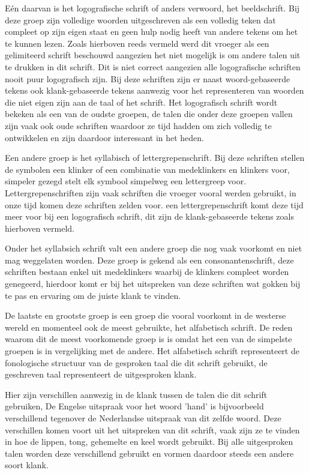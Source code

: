Eén daarvan is het logografische schrift of anders verwoord, het beeldschrift.
Bij deze groep zijn volledige woorden uitgeschreven als een volledig teken dat compleet op zijn eigen staat en geen hulp nodig heeft van andere tekens om het te kunnen lezen.
Zoals hierboven reeds vermeld werd dit vroeger als een gelimiteerd schrift beschouwd aangezien het niet mogelijk is om andere talen uit te drukken in dit schrift.
Dit is niet correct aangezien alle logografische schriften nooit puur logografisch zijn. Bij deze schriften zijn er naast woord-gebaseerde tekens ook klank-gebaseerde tekens aanwezig voor het representeren van woorden die niet eigen zijn aan de taal of het schrift.
Het logografisch schrift wordt bekeken als een van de oudste groepen, de talen die onder deze groepen vallen zijn vaak ook oude schriften waardoor ze tijd hadden om zich volledig te ontwikkelen en zijn daardoor interessant in het heden.

Een andere groep is het syllabisch of lettergrepenschrift.
Bij deze schriften stellen de symbolen een klinker of een combinatie van medeklinkers en klinkers voor, simpeler gezegd stelt elk symbool simpelweg een lettergreep voor.
Lettergrepenschriften zijn vaak schriften die vroeger vooral werden gebruikt, in onze tijd komen deze schriften zelden voor.
een lettergrepenschrift komt deze tijd meer voor bij een logografisch schrift, dit zijn de klank-gebaseerde tekens zoals hierboven vermeld.

Onder het syllabsich schrift valt een andere groep die nog vaak voorkomt en niet mag weggelaten worden.
Deze groep is gekend als een consonantenschrift, deze schriften bestaan enkel uit medeklinkers waarbij de klinkers compleet worden genegeerd, hierdoor komt er bij het uitspreken van deze schriften wat gokken bij te pas en ervaring om de juiste klank te vinden.


De laatste en grootste groep is een groep die vooral voorkomt in de westerse wereld en momenteel ook de meest gebruikte, het alfabetisch schrift.
De reden waarom dit de meest voorkomende groep is is omdat het een van de simpelste groepen is in vergelijking met de andere.
Het alfabetisch schrift representeert de fonologische structuur van de gesproken taal die dit schrift gebruikt, de geschreven taal representeert de uitgesproken klank.

Hier zijn verschillen aanwezig in de klank tussen de talen die dit schrift gebruiken, De Engelse uitspraak voor het woord 'hand' is bijvoorbeeld verschillend tegenover de Nederlandse uitspraak van dit zelfde woord.
Deze verschillen komen voort uit het uitspreken van dit schrift, vaak zijn ze te vinden in hoe de lippen, tong, gehemelte en keel wordt gebruikt. Bij alle uitgesproken talen worden deze verschillend gebruikt en vormen daardoor steeds een andere soort klank. 

